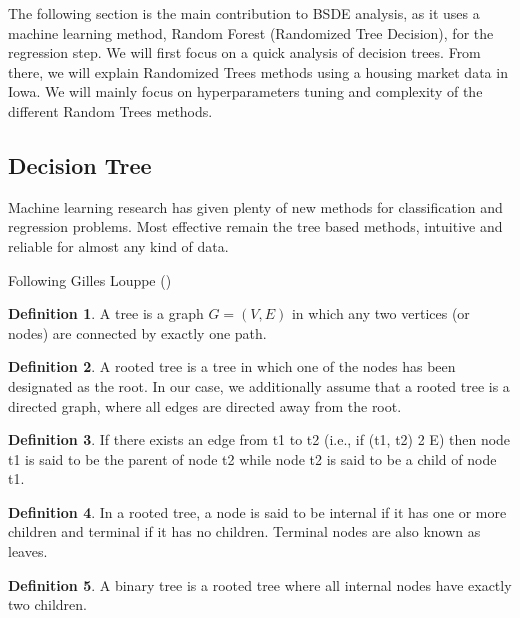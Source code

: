 \documentclass[english,11pt,openany]{report}
\theoremstyle{definition}
\newtheorem{defn}{Definition}[section]
\theoremstyle{plain}
\theoremstyle{definition}
\begin{document}
	
\begin{minipage}{\textwidth-2\fboxrule-2\fboxsep\relax}
	The following section is the main contribution to BSDE analysis, as it uses a machine learning method, Random Forest (Randomized Tree Decision), for the regression step. 
	We will first focus on a quick analysis of decision trees. From there, we will explain Randomized Trees methods using a housing market data in Iowa. We will mainly focus on  hyperparameters tuning and complexity of the different Random Trees methods. 
\end{minipage}


\subsection{Decision Tree}
Machine learning research has given plenty of new methods for classification and regression problems. Most effective remain the tree based methods, intuitive and reliable for almost any kind of data. 

Following Gilles Louppe (\cite{glouppe:rf}) 

\begin{defn}
	A tree is a graph $G = (V, E)$ in which any two vertices (or
	nodes) are connected by exactly one path.
\end{defn}

\begin{defn}
	A rooted tree is a tree in which one of the nodes has been
	designated as the root. In our case, we additionally assume that a rooted tree
	is a directed graph, where all edges are directed away from the root.
\end{defn}

\begin{defn}
	If there exists an edge from t1 to t2 (i.e., if (t1, t2) 2 E)
	then node t1 is said to be the parent of node t2 while node t2 is said to be a
	child of node t1.
\end{defn}

\begin{defn}
	In a rooted tree, a node is said to be internal if it has one
	or more children and terminal if it has no children. Terminal nodes are also
	known as leaves.
\end{defn}

\begin{defn}
	A binary tree is a rooted tree where all internal nodes have
	exactly two children.
\end{defn}
\end{document}
